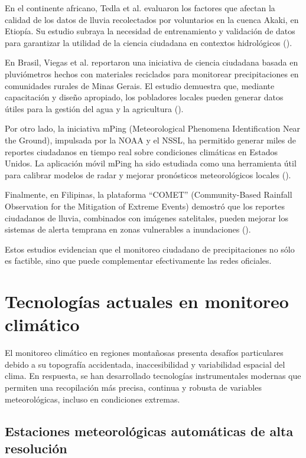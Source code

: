En el continente africano, Tedla et al. evaluaron los factores que afectan la calidad de los datos de lluvia recolectados por voluntarios en la cuenca Akaki, en Etiopía. Su estudio subraya la necesidad de entrenamiento y validación de datos para garantizar la utilidad de la ciencia ciudadana en contextos hidrológicos  (\cite{tedla2022evaluation}).

En Brasil, Viegas et al. reportaron una iniciativa de ciencia ciudadana basada en pluviómetros hechos con materiales reciclados para monitorear precipitaciones en comunidades rurales de Minas Gerais. El estudio demuestra que, mediante capacitación y diseño apropiado, los pobladores locales pueden generar datos útiles para la gestión del agua y la agricultura  (\cite{viegas2023citizen}).

Por otro lado, la iniciativa mPing (Meteorological Phenomena Identification Near the Ground), impulsada por la NOAA y el NSSL, ha permitido generar miles de reportes ciudadanos en tiempo real sobre condiciones climáticas en Estados Unidos. La aplicación móvil mPing ha sido estudiada como una herramienta útil para calibrar modelos de radar y mejorar pronósticos meteorológicos locales  (\cite{elmore2014mping}).

Finalmente, en Filipinas, la plataforma ``COMET'' (Community-Based Rainfall Observation for the Mitigation of Extreme Events) demostró que los reportes ciudadanos de lluvia, combinados con imágenes satelitales, pueden mejorar los sistemas de alerta temprana en zonas vulnerables a inundaciones (\cite{okada2019community}).

Estos estudios evidencian que el monitoreo ciudadano de precipitaciones no sólo es factible, sino que puede complementar efectivamente las redes oficiales.




\newpage
\section{Tecnologías actuales en monitoreo climático}
El monitoreo climático en regiones montañosas presenta desafíos particulares debido a su topografía accidentada, inaccesibilidad y variabilidad espacial del clima. En respuesta, se han desarrollado tecnologías instrumentales modernas que permiten una recopilación más precisa, continua y robusta de variables meteorológicas, incluso en condiciones extremas.



\subsection{Estaciones meteorológicas automáticas de alta resolución}

